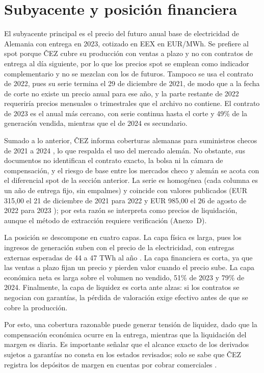\documentclass[11pt,letterpaper]{article}
\theoremstyle{plain}
\theoremstyle{definition}
\theoremstyle{remark}
\numberwithin{equation}{section}
\begin{document}
\section{Subyacente y posición financiera}

El {subyacente principal} es el precio del futuro anual base de electricidad de Alemania con entrega en 2023, cotizado en EEX en EUR/MWh. Se prefiere al spot porque ČEZ cubre su producción con ventas a plazo y no con contratos de entrega al día siguiente, por lo que los precios spot se emplean como indicador complementario y no se mezclan con los de futuros. Tampoco se usa el contrato de 2022, pues su serie termina el 29 de diciembre de 2021, de modo que a la fecha de corte no existe un precio anual para ese año, y la parte restante de 2022 requeriría precios mensuales o trimestrales que el archivo no contiene. El contrato de 2023 es el anual más cercano, con serie continua hasta el corte y 49\% de la generación vendida, mientras que el de 2024 es secundario.

Sumado a lo anterior, ČEZ informa coberturas alemanas para suministros checos de 2021 a 2024 \parencite{cez_q2_2021}, lo que respalda el uso del mercado alemán. No obstante, sus documentos no identifican el contrato exacto, la bolsa ni la cámara de compensación, y el riesgo de base entre los mercados checo y alemán se acota con el diferencial spot de la sección anterior. La serie es homogénea (cada columna es un año de entrega fijo, sin empalmes) y coincide con valores publicados (EUR 315,00 el 21 de diciembre de 2021 para 2022 \parencite{platts_2021_dec} y EUR 985,00 el 26 de agosto de 2022 para 2023 \parencite{eex_2022}); por esta razón se interpreta como precios de liquidación, aunque el método de extracción requiere verificación (Anexo~D).

La {posición} se descompone en cuatro capas. La capa física es larga, pues los ingresos de generación suben con el precio de la electricidad, con entregas externas esperadas de 44 a 47 TWh al año \parencite{cez_q3_2021}. La capa financiera es corta, ya que las ventas a plazo fijan un precio y pierden valor cuando el precio sube. La capa económica neta es larga sobre el volumen no vendido, 51\% de 2023 y 79\% de 2024. Finalmente, la capa de liquidez es corta ante alzas: si los contratos se negocian con garantías, la pérdida de valoración exige efectivo antes de que se cobre la producción.

Por esto, una cobertura razonable puede generar tensión de liquidez, dado que la compensación económica ocurre en la entrega, mientras que la liquidación del margen es diaria. Es importante señalar que el alcance exacto de los derivados sujetos a garantías no consta en los estados revisados; solo se sabe que ČEZ registra los depósitos de margen en cuentas por cobrar comerciales \parencite[p.~16]{GIANNOZZI2026107700}.
\end{document}
